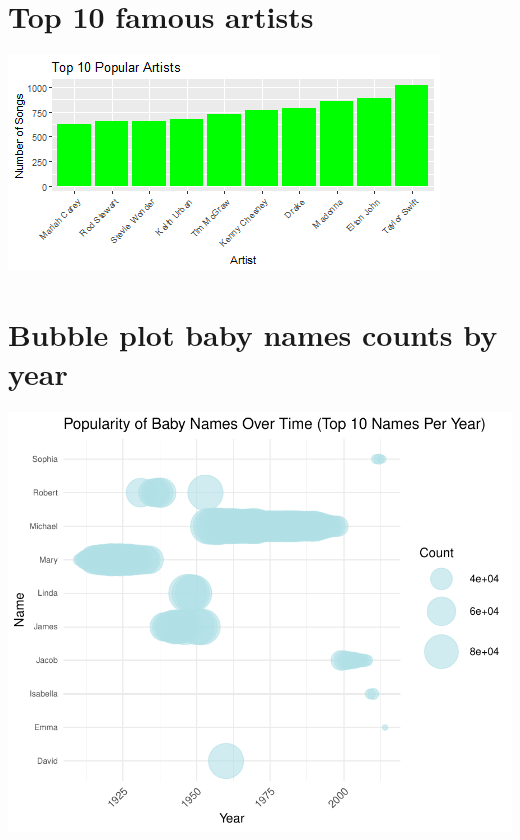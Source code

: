 \documentclass[11pt,preprint]{elsarticle}
\let\origfigure\figure
\let\endorigfigure\endfigure
\renewenvironment{figure}[1][2] {
    \expandafter\origfigure\expandafter[H]
} {
    \endorigfigure
}
\numberwithin{equation}{section}
\numberwithin{figure}{section}
\numberwithin{table}{section}
\begin{document}
\section{Top 10 famous artists}\label{top-10-famous-artists}

\begin{figure}[H]

{\centering \includegraphics{23034103_Q1USbabynames_files/figure-latex/Figure 5a-1}

}

\caption{Caption Here \label{Figure1}}\label{fig:Figure 5a}
\end{figure}

\section{Bubble plot baby names counts by
year}\label{bubble-plot-baby-names-counts-by-year}

\includegraphics{23034103_Q1USbabynames_files/figure-latex/unnamed-chunk-2-1.pdf}
\end{document}
